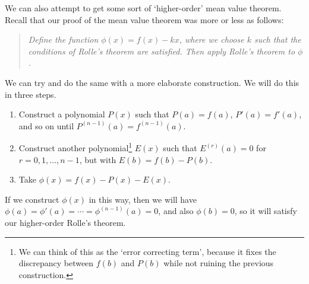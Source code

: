 \documentclass[11pt, a4paper]{article}
\theoremstyle{definition}
\begin{document}
We can also attempt to get some sort of `higher-order' mean value theorem. Recall that our proof of the mean value theorem was more or less as follows:
\begin{quotation}\noindent
	\emph{Define the function $\phi(x) = f(x) - kx$, where we choose $k$ such that the conditions of Rolle's theorem are satisfied.
	Then apply Rolle's theorem to $\phi$.}
\end{quotation}
We can try and do the same with a more elaborate construction. We will do this in three steps.
\begin{enumerate}
	\item Construct a polynomial $P(x)$ such that $P(a) = f(a)$, $P'(a) = f'(a)$, and so on until $P^{(n - 1)}(a) = f^{(n - 1)}(a)$.
	\item Construct another polynomial\footnote{We can think of this as the `error correcting term', because it fixes the discrepancy between $f(b)$ and $P(b)$ while not ruining the previous construction.} $E(x)$ such that $E^{(r)}(a) = 0$ for $r = 0, 1, \dots, n - 1$, but with $E(b) = f(b) - P(b)$.
	\item Take $\phi(x) = f(x) - P(x) - E(x)$.
\end{enumerate}
If we construct $\phi(x)$ in this way, then we will have $\phi(a) = \phi'(a) = \cdots = \phi^{(n - 1)}(a) = 0$, and also $\phi(b) = 0$, so it will satisfy our higher-order Rolle's theorem.
\end{document}
